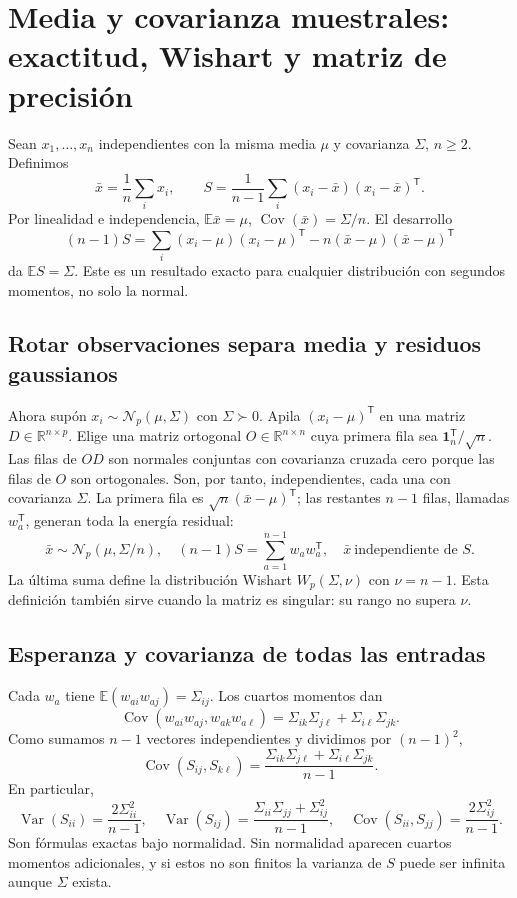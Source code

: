 \documentclass[11pt,a4paper]{article}
\newcommand{\R}{\mathbb R}
\newcommand{\E}{\mathbb E}
\newcommand{\T}{^{\mathsf T}}
\DeclareMathOperator{\Var}{Var}
\DeclareMathOperator{\Cov}{Cov}
\newcommand{\ones}{\mathbf 1}
\theoremstyle{definition}
\begin{document}
\section{Media y covarianza muestrales: exactitud, Wishart y matriz de precisión}
Sean $x_1,\ldots,x_n$ independientes con la misma media $\mu$ y covarianza $\Sigma$, $n\ge2$. Definimos
\[
\bar x=\frac1n\sum_i x_i,\qquad
S=\frac1{n-1}\sum_i(x_i-\bar x)(x_i-\bar x)\T.
\]
Por linealidad e independencia, $\E\bar x=\mu$, $\Cov(\bar x)=\Sigma/n$. El desarrollo
\[
(n-1)S=\sum_i(x_i-\mu)(x_i-\mu)\T-n(\bar x-\mu)(\bar x-\mu)\T
\]
da $\E S=\Sigma$. Este es un resultado exacto para cualquier distribución con segundos momentos, no solo la normal.
\subsection{Rotar observaciones separa media y residuos gaussianos}
Ahora supón $x_i\sim\mathcal N_p(\mu,\Sigma)$ con $\Sigma\succ0$. Apila $(x_i-\mu)\T$ en una matriz $D\in\R^{n\times p}$. Elige una matriz ortogonal $O\in\R^{n\times n}$ cuya primera fila sea $\ones_n\T/\sqrt n$. Las filas de $OD$ son normales conjuntas con covarianza cruzada cero porque las filas de $O$ son ortogonales. Son, por tanto, independientes, cada una con covarianza $\Sigma$.
La primera fila es $\sqrt n(\bar x-\mu)\T$; las restantes $n-1$ filas, llamadas $w_a\T$, generan toda la energía residual:
\[
\bar x\sim\mathcal N_p(\mu,\Sigma/n),\quad
(n-1)S=\sum_{a=1}^{n-1}w_aw_a\T,
\quad\bar x\ \text{independiente de }S.
\]
La última suma define la distribución Wishart $W_p(\Sigma,\nu)$ con $\nu=n-1$. Esta definición también sirve cuando la matriz es singular: su rango no supera $\nu$.
\subsection{Esperanza y covarianza de todas las entradas}
Cada $w_a$ tiene $\E(w_{ai}w_{aj})=\Sigma_{ij}$. Los cuartos momentos dan
\[
\Cov(w_{ai}w_{aj},w_{ak}w_{a\ell})
=\Sigma_{ik}\Sigma_{j\ell}+\Sigma_{i\ell}\Sigma_{jk}.
\]
Como sumamos $n-1$ vectores independientes y dividimos por $(n-1)^2$,
\[
\boxed{\Cov(S_{ij},S_{k\ell})=
\frac{\Sigma_{ik}\Sigma_{j\ell}+\Sigma_{i\ell}\Sigma_{jk}}{n-1}}.
\]
En particular,
\[
\Var(S_{ii})=\frac{2\Sigma_{ii}^2}{n-1},\quad
\Var(S_{ij})=\frac{\Sigma_{ii}\Sigma_{jj}+\Sigma_{ij}^2}{n-1},\quad
\Cov(S_{ii},S_{jj})=\frac{2\Sigma_{ij}^2}{n-1}.
\]
Son fórmulas exactas bajo normalidad. Sin normalidad aparecen cuartos momentos adicionales, y si estos no son finitos la varianza de $S$ puede ser infinita aunque $\Sigma$ exista.
\end{document}
